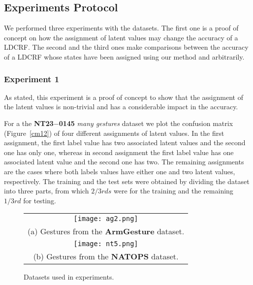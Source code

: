 \documentclass[10pt, conference]{IEEEtran}
\begin{document}
\subsection{Experiments Protocol}
 
We performed three experiments with the datasets. The first one is a proof of concept on how the assignment of latent values may change the accuracy of a LDCRF. The second and the third ones make comparisons between the accuracy of a LDCRF whose states have been assigned using our method and arbitrarily.


\subsubsection{Experiment 1}

As stated, this experiment is a proof of concept to show that the assignment of the latent values is non-trivial and has a considerable impact in the accuracy. 

For a the \textbf{NT23$-$0145} \textit{many gestures} dataset we plot the confusion matrix (Figure~\ref{cm12}) of four different assignments of latent values.
In the first assignment, the first label value has two associated latent  values and the second one has only one, whereas in second assignment the first label value has one associated latent value and the second one has two. The remaining assignments are the cases where both labels values have either one and two latent values, respectively. 
The training and the test sets were obtained by dividing the dataset into three parts, from which $2/3rds$ were for the training and the remaining $1/3rd$ for testing.



\begin{figure*}[t]
	\centering
	\begin{tabular}{c}
		\texttt{[image: ag2.png]} \\
		(a) Gestures from the \textbf{ArmGesture} dataset. \\
		\texttt{[image: nt5.png]} \\
		(b) Gestures from the \textbf{NATOPS} dataset. \\
	\end{tabular}
	\caption{Datasets used in experiments.}
	\label{ag_nt}
\end{figure*}
\end{document}
